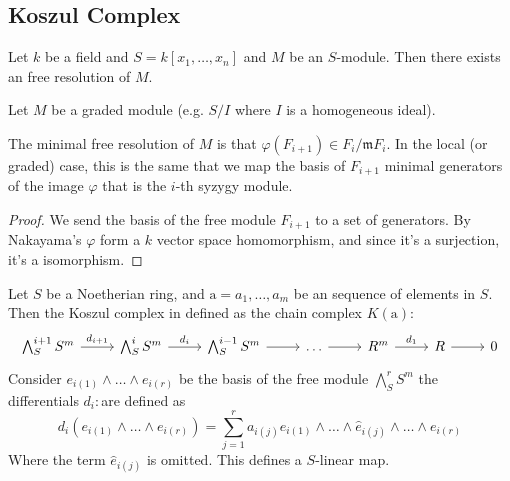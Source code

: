 \newcommand{\pd}{\operatorname{pd}}
\newcommand{\depth}{\operatorname{depth}}
\newcommand{\ext}{\operatorname{Ext}}


\subsection{Koszul Complex}
\begin{definition}
	\label{def:koszul}
	Let $k$ be a field and $S = k[x_1, \dots, x_n]$ and $M$ be an $S$-module.
	Then there exists an free resolution of $M$.
\end{definition}

\begin{theorem}
	Let $M$ be a graded module (e.g. $S/I$ where $I$ is a homogeneous ideal).
\end{theorem}


\begin{lemma}
	\label{lem:min_res_maps_gen_to_basis}
	The minimal free resolution of $M$ is that $\varphi (F_{i+1}) \in F_{i}/\mathfrak{m}F_i$.
	In the local (or graded) case, this is the same that we map the basis of $F_{i+1}$ minimal generators of the image $\varphi$ that is the $i$-th syzygy module.
\end{lemma}
\begin{proof}
	We send the basis of the free module $F_{i+1}$ to a set of generators.
	By Nakayama's $\varphi$ form a $k$ vector space homomorphism, and since it's a surjection, it's a isomorphism.
\end{proof}

\begin{definition}
	Let $S$ be a Noetherian ring, and $\mathrm{a} = a_1, \dots, a_m$ be an sequence of elements in $S$. 
	Then the Koszul complex in defined as the chain complex $K(\mathrm{a})$:
	$$\begin{tikzcd}
	\bigwedge^{i+1}_S S^m \arrow[r, "d_{i+1}"] & \bigwedge^i_S S^m \arrow[r, "d_i"] & \bigwedge^{i-1}_S S^m \arrow[r] & \dots \arrow[r] & R^m \arrow[r, "d_1"] & R \arrow[r] & 0
	\end{tikzcd}$$
	Consider $e_{i(1)}\wedge \dots \wedge e_{i(r)}$ be the basis of the free module $\bigwedge^{r}_S S^m$ the differentials $d_i: $are defined as 
	$$d_i(e_{i(1)}\wedge \dots \wedge e_{i(r)})  = \sum_{j = 1}^{r} a_{i(j)} e_{i(1)} \wedge \dots \wedge \hat e_{i(j)} \wedge \dots \wedge e_{i(r)}$$
	Where the term $\hat e_{i(j)}$ is omitted.
	This defines a $S$-linear map.
\end{definition}

